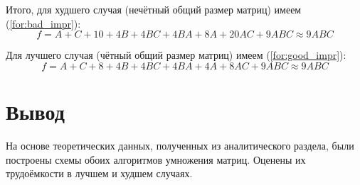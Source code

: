 Итого, для худшего случая (нечётный общий размер матриц) имеем (\ref{for:bad_impr}):
\begin{equation}
    \label{for:bad_impr}
    f = A + C + 10 + 4B + 4BC + 4BA + 8A + 20AC + 9ABC \approx 9ABC
\end{equation}

Для лучшего случая (чётный общий размер матриц) имеем (\ref{for:good_impr}):
\begin{equation}
    \label{for:good_impr}
    f = A + C + 8 + 4B +4BC + 4BA + 4A + 8AC + 9ABC \approx 9ABC
\end{equation}

\section*{Вывод}
На основе теоретических данных, полученных из аналитического раздела, были построены схемы обоих алгоритмов умножения матриц.  Оценены их трудоёмкости в лучшем и худшем случаях.
